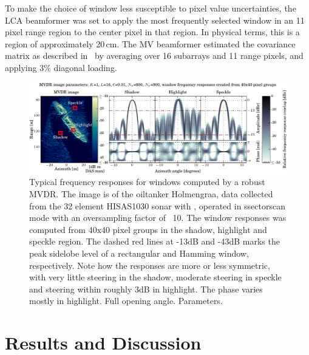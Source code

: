 \documentclass[10pt,journal,draftclsnofoot,onecolumn]{IEEEtran}
\let\MYoriglatexcaption\caption               %
\renewcommand{\caption}[2][\relax]{\MYoriglatexcaption[#2]{#2}}
\newcommand\1{\vec 1}
\begin{document}
To make the choice of window less susceptible to pixel value uncertainties, the LCA beamformer was set to apply the most frequently selected window in an 11 pixel range region to the center pixel in that region. In physical terms, this is a region of approximately 20\,cm. The MV beamformer estimated the covariance matrix as described in~\cite{syn07} by averaging over 16 subarrays and 11 range pixels, and applying 3\% diagonal loading.



\begin{figure}[tbhp!]\centering%
\includegraphics[width=\linewidth]{gfx/mvdr_selected_windows_holmengraa.pdf}%
\caption{Typical frequency responses for windows computed by a robust MVDR. The image is of the oiltanker Holmengraa, data collected from the 32 element HISAS1030 sonar with , operated in ssectorscan mode with an oversampling factor of ~10. The window responses was computed from 40x40 pixel groups in the shadow, highlight and speckle region. The dashed red lines at -13dB and -43dB marks the peak sidelobe level of a rectangular and Hamming window, respectively. Note how the responses are more or less symmetric, with very little steering in the shadow, moderate steering in speckle and steering within roughly 3dB in highlight. The phase varies mostly in highlight. Full opening angle. Parameters. }\label{mvdr_selected_windows}
\end{figure}

\newpage



\section{Results and Discussion}
\end{document}
